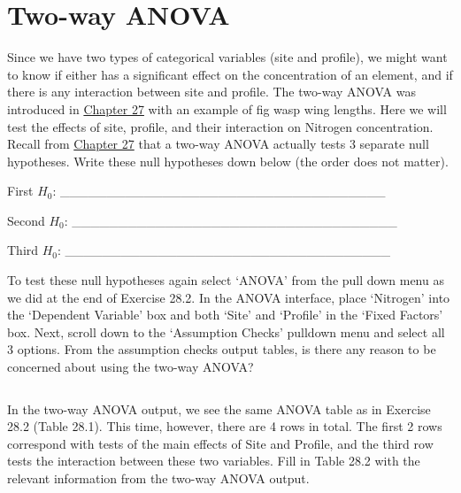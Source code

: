 \documentclass[
  openany]{krantz}
\begin{document}
\hypertarget{two-way-anova}{%
\section{Two-way ANOVA}\label{two-way-anova}}

Since we have two types of categorical variables (site and profile), we might want to know if either has a significant effect on the concentration of an element, and if there is any interaction between site and profile.
The two-way ANOVA was introduced in \protect\hyperlink{Chapter_27}{Chapter 27} with an example of fig wasp wing lengths.
Here we will test the effects of site, profile, and their interaction on Nitrogen concentration.
Recall from \protect\hyperlink{Chapter_27}{Chapter 27} that a two-way ANOVA actually tests 3 separate null hypotheses.
Write these null hypotheses down below (the order does not matter).

First \(H_{0}\): \_\_\_\_\_\_\_\_\_\_\_\_\_\_\_\_\_\_\_\_\_\_\_\_\_\_\_\_\_\_\_\_\_\_\_

Second \(H_{0}\): \_\_\_\_\_\_\_\_\_\_\_\_\_\_\_\_\_\_\_\_\_\_\_\_\_\_\_\_\_\_\_\_\_\_\_

Third \(H_{0}\): \_\_\_\_\_\_\_\_\_\_\_\_\_\_\_\_\_\_\_\_\_\_\_\_\_\_\_\_\_\_\_\_\_\_\_

To test these null hypotheses again select `ANOVA' from the pull down menu as we did at the end of Exercise 28.2.
In the ANOVA interface, place `Nitrogen' into the `Dependent Variable' box and both `Site' and `Profile' in the `Fixed Factors' box.
Next, scroll down to the `Assumption Checks' pulldown menu and select all 3 options.
From the assumption checks output tables, is there any reason to be concerned about using the two-way ANOVA?

\begin{verbatim}
\end{verbatim}

In the two-way ANOVA output, we see the same ANOVA table as in Exercise 28.2 (Table 28.1).
This time, however, there are 4 rows in total.
The first 2 rows correspond with tests of the main effects of Site and Profile, and the third row tests the interaction between these two variables.
Fill in Table 28.2 with the relevant information from the two-way ANOVA output.
\end{document}
